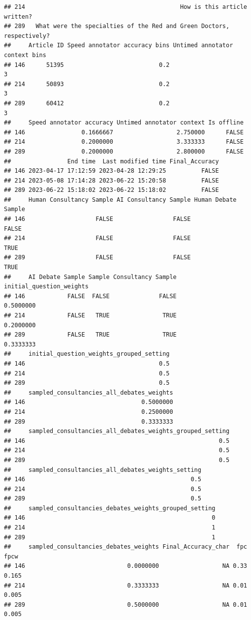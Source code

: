 \documentclass[
]{article}
\begin{document}
\begin{verbatim}
## 214                                            How is this article written?
## 289   What were the specialties of the Red and Green Doctors, respectively?
##     Article ID Speed annotator accuracy bins Untimed annotator context bins
## 146      51395                           0.2                              3
## 214      50893                           0.2                              3
## 289      60412                           0.2                              3
##     Speed annotator accuracy Untimed annotator context Is offline
## 146                0.1666667                  2.750000      FALSE
## 214                0.2000000                  3.333333      FALSE
## 289                0.2000000                  2.800000      FALSE
##                End time  Last modified time Final_Accuracy
## 146 2023-04-17 17:12:59 2023-04-28 12:29:25          FALSE
## 214 2023-05-08 17:14:28 2023-06-22 15:20:58          FALSE
## 289 2023-06-22 15:18:02 2023-06-22 15:18:02          FALSE
##     Human Consultancy Sample AI Consultancy Sample Human Debate Sample
## 146                    FALSE                 FALSE               FALSE
## 214                    FALSE                 FALSE                TRUE
## 289                    FALSE                 FALSE                TRUE
##     AI Debate Sample Sample Consultancy Sample initial_question_weights
## 146            FALSE  FALSE              FALSE                0.5000000
## 214            FALSE   TRUE               TRUE                0.2000000
## 289            FALSE   TRUE               TRUE                0.3333333
##     initial_question_weights_grouped_setting
## 146                                      0.5
## 214                                      0.5
## 289                                      0.5
##     sampled_consultancies_all_debates_weights
## 146                                 0.5000000
## 214                                 0.2500000
## 289                                 0.3333333
##     sampled_consultancies_all_debates_weights_grouped_setting
## 146                                                       0.5
## 214                                                       0.5
## 289                                                       0.5
##     sampled_consultancies_all_debates_weights_setting
## 146                                               0.5
## 214                                               0.5
## 289                                               0.5
##     sampled_consultancies_debates_weights_grouped_setting
## 146                                                     0
## 214                                                     1
## 289                                                     1
##     sampled_consultancies_debates_weights Final_Accuracy_char  fpc  fpcw
## 146                             0.0000000                  NA 0.33 0.165
## 214                             0.3333333                  NA 0.01 0.005
## 289                             0.5000000                  NA 0.01 0.005
\end{verbatim}
\end{document}
